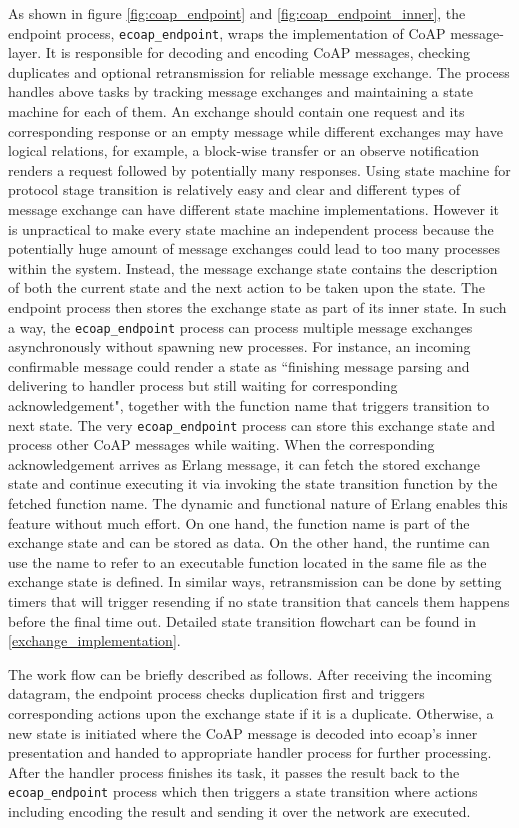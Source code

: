 As shown in figure \ref{fig:coap_endpoint} and \ref{fig:coap_endpoint_inner}, the endpoint process, \verb|ecoap_endpoint|, wraps the implementation of CoAP message-layer. It is responsible for decoding and encoding CoAP messages, checking duplicates and optional retransmission for reliable message exchange. The process handles above tasks by tracking message exchanges and maintaining a state machine for each of them. An exchange should contain one request and its corresponding response or an empty message while different exchanges may have logical relations, for example, a block-wise transfer or an observe notification renders a request followed by potentially many responses. Using state machine for protocol stage transition is relatively easy and clear and different types of message exchange can have different state machine implementations. However it is unpractical to make every state machine an independent process because the potentially huge amount of message exchanges could lead to too many processes within the system. Instead, the message exchange state contains the description of both the current state and the next action to be taken upon the state. The endpoint process then stores the exchange state as part of its inner state. In such a way, the \verb|ecoap_endpoint| process can process multiple message exchanges asynchronously without spawning new processes. For instance, an incoming confirmable message could render a state as ``finishing message parsing and delivering to handler process but still waiting for corresponding acknowledgement", together with the function name that triggers transition to next state. The very \verb|ecoap_endpoint| process can store this exchange state and process other CoAP messages while waiting. When the corresponding acknowledgement arrives as Erlang message, it can fetch the stored exchange state and continue executing it via invoking the state transition function by the fetched function name. The dynamic and functional nature of Erlang enables this feature without much effort. On one hand, the function name is part of the exchange state and can be stored as data. On the other hand, the runtime can use the name to refer to an executable function located in the same file as the exchange state is defined. In similar ways, retransmission can be done by setting timers that will trigger resending if no state transition that cancels them happens before the final time out. Detailed state transition flowchart can be found in \ref{exchange_implementation}.

The work flow can be briefly described as follows. After receiving the incoming datagram, the endpoint process checks duplication first and triggers corresponding actions upon the exchange state if it is a duplicate. Otherwise, a new state is initiated where the CoAP message is decoded into ecoap's inner presentation and handed to appropriate handler process for further processing. After the handler process finishes its task, it passes the result back to the \verb|ecoap_endpoint| process which then  triggers a state transition where actions including encoding the result and sending it over the network are executed.

